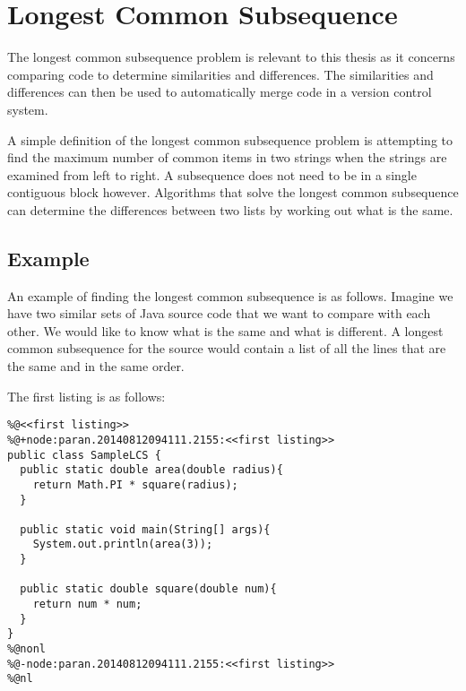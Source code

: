 \section{Longest Common Subsequence}
The longest common subsequence problem is relevant to this thesis as it concerns comparing code to determine similarities and differences.
The similarities and differences can then be used to automatically merge code in a version control system.

A simple definition of the longest common subsequence problem is attempting to find the maximum number of common items in two strings when the strings are examined from left to right. A subsequence does not need to be in a single contiguous block however. Algorithms that solve the longest common subsequence can determine the differences between two lists by working out what is the same.   


\subsection{Example}
\label{sec:examplelcs}

An example of finding the longest common subsequence is as follows.
Imagine we have two similar sets of Java source code that we want to compare with each other.  
We would like to know what is the same and what is different.
A longest common subsequence for the source would contain a list of all the lines that are the same and in the same order.


\begin{minipage}[t]{1.0\textwidth}
The first listing is as follows:

\begin{lstlisting}
%@<<first listing>>
%@+node:paran.20140812094111.2155:<<first listing>>
public class SampleLCS {
  public static double area(double radius){
    return Math.PI * square(radius);
  }
  
  public static void main(String[] args){
    System.out.println(area(3));
  }
 
  public static double square(double num){
    return num * num;
  }
}
%@nonl
%@-node:paran.20140812094111.2155:<<first listing>>
%@nl
\end{lstlisting}
\end{minipage}

